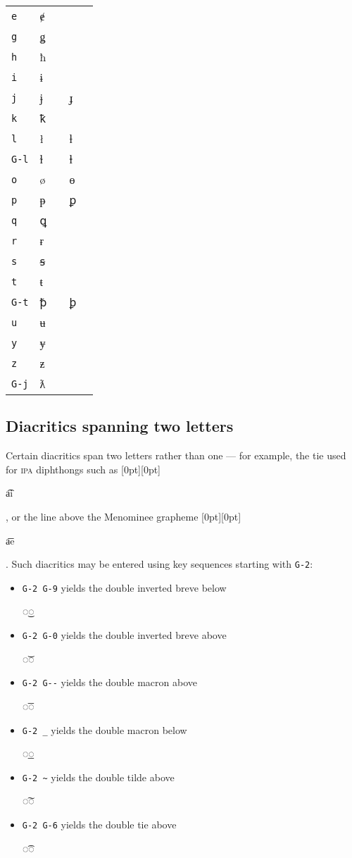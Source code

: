 \documentclass[oneside]{memoir}
\newcommand{\cmark}{\ding{51}}
\newcommand{\xmark}{\ding{55}}
\newcommand{\key}{\verb}
\newcommand{\out}[1]{\raisebox{0pt}[0pt][0pt]{\setlength{\fboxsep}{1pt}\colorbox{gray!20}{\strut{}#1}}}
\newcommand{\outsp}[1]{\colorbox{gray!20}{\strut{}#1}}
\begin{document}
{\begin{table}[!b]
\begin{minipage}{0.55\paperwidth}
\begin{tabular}{lllll}
\key|e|   & ɇ & \cmark &   & \\
\key|g|   & ǥ & \cmark &   & \\
\key|h|   & ħ & \cmark &   & \\
\key|i|   & ɨ & \cmark &   & \\
\key|j|   & ɉ & \cmark & ɟ & \xmark \\
\key|k|   & ꝁ & \cmark &   & \\
\key|l|   & ł & \cmark & ƚ & \cmark \\
\key|G-l| & ɫ & \cmark & ⱡ & \cmark \\
\key|o|   & ø & \cmark & ɵ & \cmark \\
\key|p|   & ᵽ & \cmark & ꝑ & \cmark \\
\key|q|   & ꝗ & \cmark &   & \\
\key|r|   & ɍ & \cmark &   & \\
\key|s|   & ꞩ & \cmark &   & \\
\key|t|   & ŧ & \cmark &   & \\
\key|G-t| & ꝥ & \cmark & ꝧ & \cmark \\
\key|u|   & ʉ & \cmark &   & \\
\key|y|   & ɏ & \cmark &   & \\
\key|z|   & ƶ & \cmark &   & \\
\key|G-j| & ƛ & \xmark &   & \\
\bottomrule
\end{tabular}
\end{minipage}
\end{table}

\subsection{Diacritics spanning two letters}
\label{sec:diacritics_spanning_two_letters}

Certain diacritics span two letters rather than one --- for example, the tie used for \textsc{ipa} diphthongs such as \out{a͡i}, or the line above the Menominee grapheme \out{a͞e}.
Such diacritics may be entered using key sequences starting with \key|G-2|:

\begin{itemize}[noitemsep]
\item \key|G-2 G-9| yields the double inverted breve below \outsp{◌͜◌}
\item \key|G-2 G-0| yields the double inverted breve above \outsp{◌͝◌}
\item \key|G-2 G--| yields the double macron above \outsp{◌͞◌}
\item \key|G-2 _| yields the double macron below \outsp{◌͟◌}
\item \key|G-2 ~| yields the double tilde above \outsp{◌͠◌}
\item \key|G-2 G-6| yields the double tie above \outsp{◌͡◌}
\end{itemize}

}
\end{document}
